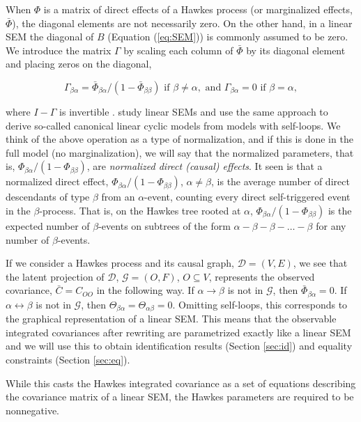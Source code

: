 \documentclass[accepted]{uai2021} %
\begin{document}
When $\Phi$ is a matrix of direct effects of a Hawkes process (or marginalized 
effects, $\bar{\Phi}$), the diagonal 
elements are not necessarily zero. On the other hand, in a linear SEM the 
diagonal of $B$ 
(Equation (\ref{eq:SEM})) is commonly assumed to be zero. We introduce 
the matrix $\Gamma$ by scaling each column of $\bar{\Phi}$ by its 
diagonal element and placing zeros on the diagonal,

$$
\Gamma_{\beta\alpha} = 
\bar{\Phi}_{\beta\alpha}/(1-\bar{\Phi}_{\beta\beta})  \text{ 
	if } \beta\neq \alpha, \text{ and } 
\Gamma_{\beta\alpha} 
= 0 \text{ if } \beta= \alpha,
$$

where $I-\Gamma$ is invertible \cite{hyttinen2012}. \cite{hyttinen2012} 
study linear SEMs and use the same approach to derive 
so-called canonical linear 
cyclic models from models with self-loops. We think of the above operation as a 
type of normalization, and if this is done in the full model (no 
marginalization), we 
will say that the normalized parameters, that is, 
${\Phi}_{\beta\alpha}/(1-{\Phi}_{\beta\beta}) $,
are \emph{normalized direct
	(causal) effects}. It seen is that a normalized direct effect, 
${\Phi}_{\beta\alpha}/(1-{\Phi}_{\beta\beta}) $, $\alpha\neq\beta$, is the 
average number of 
direct 
descendants of type 
$\beta$ from an $\alpha$-event, counting every direct self-triggered event in 
the $\beta$-process. 
That is, on the Hawkes tree rooted at $\alpha$, 
${\Phi}_{\beta\alpha}/(1-{\Phi}_{\beta\beta}) $ is 
the expected number of $\beta$-events on subtrees of the form $\alpha - \beta - 
\beta - \ldots - 
\beta$ for any number of $\beta$-events. 


If we consider a Hawkes process and its causal graph, $\mathcal{D} = (V,E)$, we 
see that the latent projection of $\mathcal{D}$, $\mathcal{G} = (O,F)$, 
$O\subseteq V$, represents the observed covariance, $\bar{C} = C_{OO}$ in the 
following way. If $\alpha\rightarrow\beta$ is not in $\mathcal{G}$, then 
$\bar{\Phi}_{\beta\alpha}=0$. If $\alpha\leftrightarrow\beta$ is not in 
$\mathcal{G}$, then $\Theta_{\beta\alpha} = \Theta_{\alpha\beta} = 0$. Omitting 
self-loops, this corresponds to the graphical representation of a linear SEM. 
This means that the observable integrated covariances after rewriting are 
parametrized exactly like a linear SEM and we will use this to obtain 
identification results (Section \ref{sec:id}) and equality constraints (Section 
\ref{sec:eq}).

While 
this 
casts the Hawkes integrated covariance as a set of equations describing the 
covariance 
matrix of a linear SEM, the Hawkes parameters are required to be nonnegative. 
\end{document}
